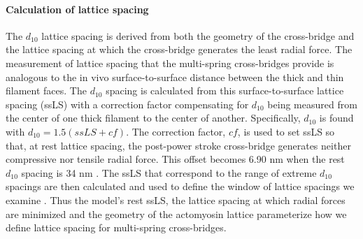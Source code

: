 \documentclass[]{article}
\begin{document}
\paragraph{Calculation of lattice spacing} %
The $d_{10}$ lattice spacing is derived from both the geometry of the cross-bridge and the lattice spacing at which the cross-bridge generates the least radial force. 
The measurement of lattice spacing that the multi-spring cross-bridges provide is analogous to the in vivo surface-to-surface distance between the thick and thin filament faces.
The $d_{10}$ spacing is calculated from this surface-to-surface lattice spacing (ssLS) with a correction factor compensating for $d_{10}$ being measured from the center of one thick filament to the center of another. 
Specifically, $d_{10}$ is found with $d_{10} = 1.5 (ssLS + cf)$. 
The correction factor, $cf$, is used to set ssLS so that, at rest lattice spacing, the post-power stroke cross-bridge generates neither compressive nor tensile radial force.  
This offset becomes 6.90 nm when the rest $d_{10}$ spacing is 34 nm \citep{Brenner1991}. 
The ssLS that correspond to the range of extreme $d_{10}$ spacings are then calculated and used to define the window of lattice spacings we examine \citep{Millman1998}. 
Thus the model's rest ssLS, the lattice spacing at which radial forces are minimized and the geometry of the actomyosin lattice parameterize how we define lattice spacing for multi-spring cross-bridges. 
\end{document}
